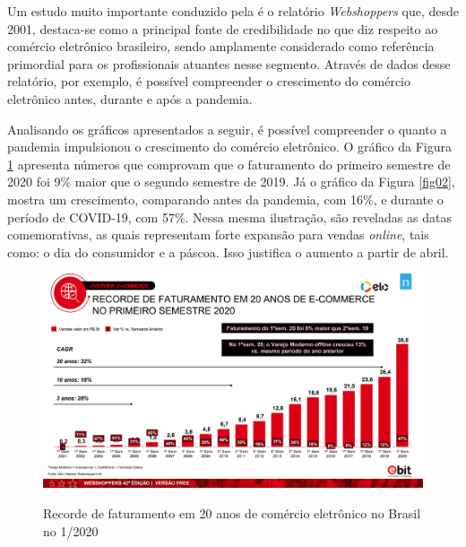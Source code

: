 Um estudo muito importante conduzido pela  é o relatório \textit{Webshoppers} que, desde 2001, destaca-se como a principal fonte de credibilidade no que diz respeito ao comércio eletrônico brasileiro, sendo amplamente considerado como referência primordial para os profissionais atuantes nesse segmento. Através de dados desse relatório, por exemplo, é possível compreender o crescimento do comércio eletrônico antes, durante e após a pandemia.

Analisando os gráficos apresentados a seguir, é possível compreender o quanto a pandemia impulsionou o crescimento do comércio eletrônico. O gráfico da Figura \ref{fig01} apresenta números que comprovam que o faturamento do primeiro semestre de 2020 foi 9\% maior que o segundo semestre de 2019. Já o gráfico da Figura \ref{fig02}, mostra um crescimento, comparando antes da pandemia, com 16\%, e durante o período de COVID-19, com 57\%. Nessa mesma ilustração, são reveladas as datas comemorativas, as quais representam forte expansão para vendas \textit{online}, tais como: o dia do consumidor e a páscoa. Isso justifica o aumento a partir de abril.

\begin{figure}[ht]
    \centering
    \caption{Recorde de faturamento em 20 anos de comércio eletrônico no Brasil no 1/2020}
    \includegraphics[keepaspectratio=true,scale=0.3]{figuras/cap02Edicao42.png}
    \label{fig01}
\end{figure}


